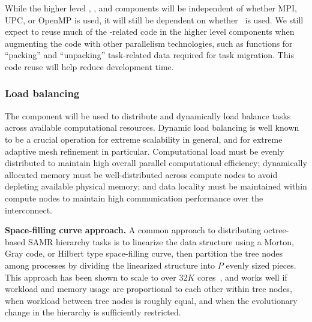 \documentclass[10pt,twocolumn]{article}
\begin{document}
While the higher level , , and
 components will be independent of whether MPI, UPC,
or OpenMP is used, it will still be dependent on whether \charm\ is
used.  We still expect to reuse much of the \charm-related code in the
higher level components when augmenting the code with other
parallelism technologies, such as functions for ``packing'' and
``unpacking'' task-related data required for task migration.  This
code reuse will help reduce development time.

\subsubsection{Load balancing} \label{sss:design-balance}

The  component will be used to distribute and
dynamically load balance tasks across available computational
resources.  Dynamic load balancing is well known to be a crucial
operation for extreme scalability in general, and for extreme adaptive
mesh refinement in particular.  Computational load must be evenly
distributed to maintain high overall parallel computational
efficiency; dynamically allocated memory must be well-distributed
across compute nodes to avoid depleting available physical memory; and
data locality must be maintained within compute nodes to maintain high
communication performance over the interconnect.

\textbf{Space-filling curve approach.}  A common approach to
distributing octree-based SAMR hierarchy tasks is to linearize the
data structure using a Morton, Gray code, or Hilbert type
space-filling curve, then partition the tree nodes among processes by
dividing the linearized structure into $P$ evenly sized pieces.  This
approach has been shown to scale to over $32K$ cores~\cite{BuGh08},
and works well if workload and memory usage are proportional to each
other within tree nodes, when workload between tree nodes is roughly
equal, and when the evolutionary change in the hierarchy is
sufficiently restricted.
\end{document}

